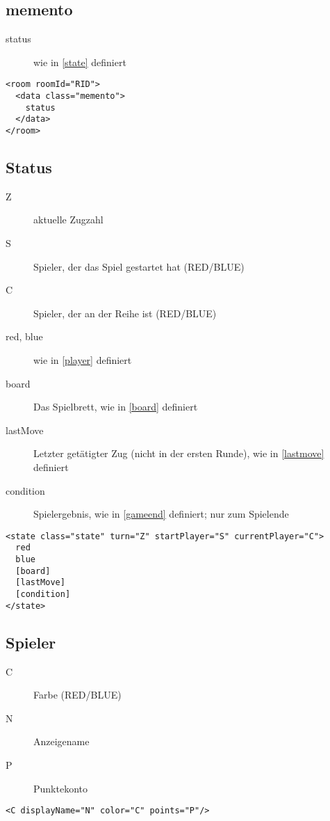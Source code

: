 \documentclass[12pt,a4paper, ngerman, oneside]{scrartcl}
\begin{document}
\subsection{memento}
\begin{description}
\item[status] wie in \ref{state} definiert
\end{description}
\begin{verbatim}
<room roomId="RID"> 
  <data class="memento"> 
  	status
  </data> 
</room>
\end{verbatim}

\subsection{\label{state}Status}
\begin{description}
\item[Z] aktuelle Zugzahl
\item[S] Spieler, der das Spiel gestartet hat (RED/BLUE)
\item[C] Spieler, der an der Reihe ist (RED/BLUE)
\item[red, blue] wie in \ref{player} definiert
\item[board] Das Spielbrett, wie in \ref{board} definiert
\item[lastMove] Letzter get\"atigter Zug (nicht in der ersten Runde), wie in
\ref{lastmove} definiert
\item[condition] Spielergebnis, wie in \ref{gameend} definiert; nur zum Spielende
\end{description}
\begin{verbatim}
<state class="state" turn="Z" startPlayer="S" currentPlayer="C">
  red
  blue
  [board]
  [lastMove]
  [condition]
</state>

\end{verbatim}

\subsection{\label{player}Spieler}
\begin{description}
\item[C] Farbe (RED/BLUE)
\item[N] Anzeigename
\item[P] Punktekonto
\end{description}
\begin{verbatim}
<C displayName="N" color="C" points="P"/>
\end{verbatim}
\end{document}

